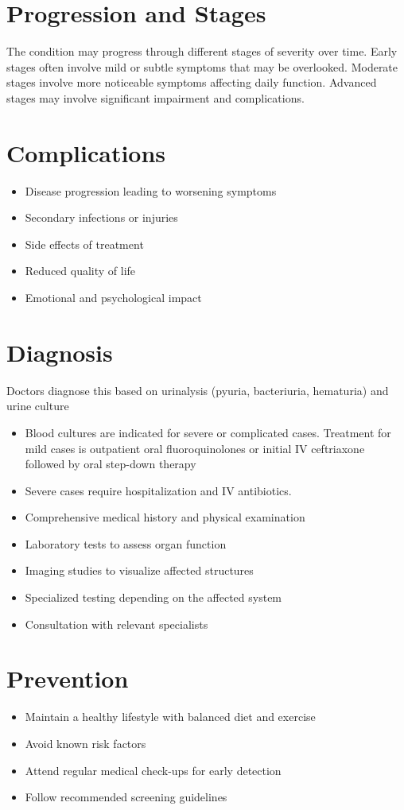 \section{Progression and Stages}
The condition may progress through different stages of severity over time. Early stages often involve mild or subtle symptoms that may be overlooked. Moderate stages involve more noticeable symptoms affecting daily function. Advanced stages may involve significant impairment and complications.
\section{Complications}
\begin{itemize}[noitemsep]
  \item Disease progression leading to worsening symptoms
  \item Secondary infections or injuries
  \item Side effects of treatment
  \item Reduced quality of life
  \item Emotional and psychological impact
\end{itemize}
\section{Diagnosis}
Doctors diagnose this based on urinalysis (pyuria, bacteriuria, hematuria) and urine culture

\begin{itemize}[noitemsep]
  \item Blood cultures are indicated for severe or complicated cases. Treatment for mild cases is outpatient oral fluoroquinolones or initial IV ceftriaxone followed by oral step-down therapy
  \item Severe cases require hospitalization and IV antibiotics.
  \item Comprehensive medical history and physical examination
  \item Laboratory tests to assess organ function
  \item Imaging studies to visualize affected structures
  \item Specialized testing depending on the affected system
  \item Consultation with relevant specialists
\end{itemize}
\section{Prevention}
\begin{itemize}[noitemsep]
  \item Maintain a healthy lifestyle with balanced diet and exercise
  \item Avoid known risk factors
  \item Attend regular medical check-ups for early detection
  \item Follow recommended screening guidelines
\end{itemize}
